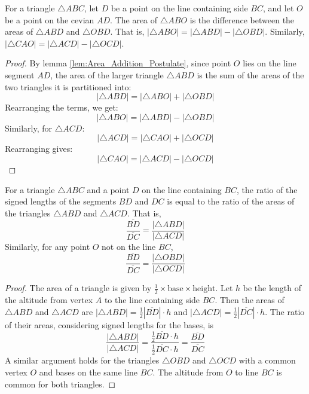 \begin{lemma}
    \label{lem:Area_Subtraction_Property}
    For a triangle $\triangle ABC$, let $D$ be a point on the line containing side $BC$, and let $O$ be a point on the cevian $AD$. The area of $\triangle ABO$ is the difference between the areas of $\triangle ABD$ and $\triangle OBD$. That is, $|\triangle ABO| = |\triangle ABD| - |\triangle OBD|$. Similarly, $|\triangle CAO| = |\triangle ACD| - |\triangle OCD|$.
\end{lemma}

\begin{proof}
    By lemma \ref{lem:Area_Addition_Postulate}, since point $O$ lies on the line segment $AD$, the area of the larger triangle $\triangle ABD$ is the sum of the areas of the two triangles it is partitioned into:
    \[ |\triangle ABD| = |\triangle ABO| + |\triangle OBD| \]
    Rearranging the terms, we get:
    \[ |\triangle ABO| = |\triangle ABD| - |\triangle OBD| \]
    Similarly, for $\triangle ACD$:
    \[ |\triangle ACD| = |\triangle CAO| + |\triangle OCD| \]
    Rearranging gives:
    \[ |\triangle CAO| = |\triangle ACD| - |\triangle OCD| \]
\end{proof}

\begin{lemma}
    \label{lem:Ratio_of_Areas_of_Triangles_with_a_Common_Altitude}
    For a triangle $\triangle ABC$ and a point $D$ on the line containing $BC$, the ratio of the signed lengths of the segments $BD$ and $DC$ is equal to the ratio of the areas of the triangles $\triangle ABD$ and $\triangle ACD$. That is,
    \[ \frac{\overline{BD}}{\overline{DC}} = \frac{|\triangle ABD|}{|\triangle ACD|} \]
    Similarly, for any point $O$ not on the line $BC$,
    \[ \frac{\overline{BD}}{\overline{DC}} = \frac{|\triangle OBD|}{|\triangle OCD|} \]
\end{lemma}

\begin{proof}
    The area of a triangle is given by $\frac{1}{2} \times \text{base} \times \text{height}$. Let $h$ be the length of the altitude from vertex $A$ to the line containing side $BC$. Then the areas of $\triangle ABD$ and $\triangle ACD$ are $|\triangle ABD| = \frac{1}{2} |\overline{BD}| \cdot h$ and $|\triangle ACD| = \frac{1}{2} |\overline{DC}| \cdot h$.
    The ratio of their areas, considering signed lengths for the bases, is
    \[ \frac{|\triangle ABD|}{|\triangle ACD|} = \frac{\frac{1}{2} \overline{BD} \cdot h}{\frac{1}{2} \overline{DC} \cdot h} = \frac{\overline{BD}}{\overline{DC}} \]
    A similar argument holds for the triangles $\triangle OBD$ and $\triangle OCD$ with a common vertex $O$ and bases on the same line $BC$. The altitude from $O$ to line $BC$ is common for both triangles.
\end{proof}

